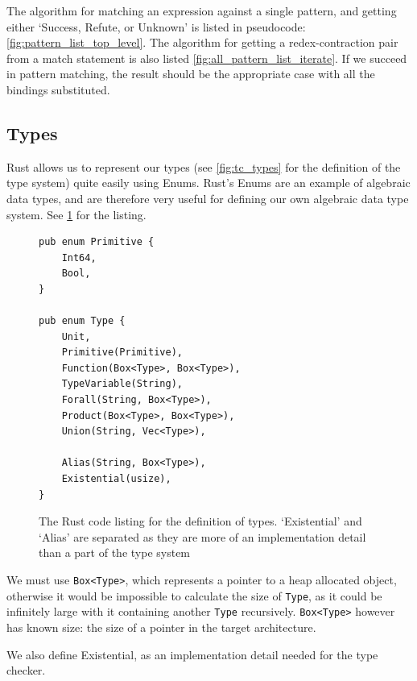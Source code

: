 The algorithm for matching an expression against a single pattern, and getting either `Success, Refute, or Unknown' is listed in pseudocode: \ref{fig:pattern_list_top_level}. The algorithm for getting a redex-contraction pair from a match statement is also listed \ref{fig:all_pattern_list_iterate}. If we succeed in pattern matching, the result should be the appropriate case with all  the bindings substituted. 


\subsection{Types}

Rust allows us to represent our types (see \ref{fig:tc_types} for the definition of the type system) quite easily using Enums. Rust's Enums are an example of algebraic data types, and are therefore very useful for defining our own algebraic data type system. See \ref{fig:type_lst} for the listing. 

\begin{figure}[ht]
    \begin{lstlisting}[language=Rust_boxed]
pub enum Primitive {
    Int64,
    Bool,
}

pub enum Type {
    Unit,
    Primitive(Primitive),
    Function(Box<Type>, Box<Type>),
    TypeVariable(String),
    Forall(String, Box<Type>),
    Product(Box<Type>, Box<Type>),
    Union(String, Vec<Type>),

    Alias(String, Box<Type>),
    Existential(usize),
}
\end{lstlisting}
    \caption{The Rust code listing for the definition of types. `Existential' and `Alias' are separated as they are more of an implementation detail than a part of the type system}
    \label{fig:type_lst}
\end{figure}

We must use \verb|Box<Type>|, which represents a pointer to a heap allocated object, otherwise it would be impossible to calculate the size of \verb|Type|, as it could be infinitely large with it containing another \verb|Type| recursively. \verb|Box<Type>| however has known size: the size of a pointer in the target architecture. 

We also define Existential, as an implementation detail needed for the type checker. 

